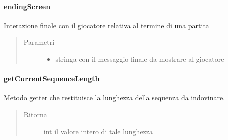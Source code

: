 \documentclass[letterpaper,10pt,italian]{sphinxmanual}
\begin{document}
\paragraph{endingScreen}
\label{\detokenize{source/it/unicam/cs/pa/mastermind/ui/InteractionView:endingscreen}}

\begin{fulllineitems}
\label{\detokenize{source/it/unicam/cs/pa/mastermind/ui/InteractionView:it.unicam.cs.pa.mastermind.ui.InteractionView.endingScreen(String)}}
Interazione finale con il giocatore relativa al termine di una partita
\begin{quote}\begin{description}
\item[{Parametri}] \leavevmode\begin{itemize}
\item {} 
 \textendash{} stringa con il messaggio finale da mostrare al giocatore

\end{itemize}

\end{description}\end{quote}

\end{fulllineitems}



\paragraph{getCurrentSequenceLength}
\label{\detokenize{source/it/unicam/cs/pa/mastermind/ui/InteractionView:getcurrentsequencelength}}

\begin{fulllineitems}
\label{\detokenize{source/it/unicam/cs/pa/mastermind/ui/InteractionView:it.unicam.cs.pa.mastermind.ui.InteractionView.getCurrentSequenceLength()}}
Metodo getter che restituisce la lunghezza della sequenza da indovinare.
\begin{quote}\begin{description}
\item[{Ritorna}] \leavevmode
int il valore intero di tale lunghezza

\end{description}\end{quote}

\end{fulllineitems}
\end{document}

